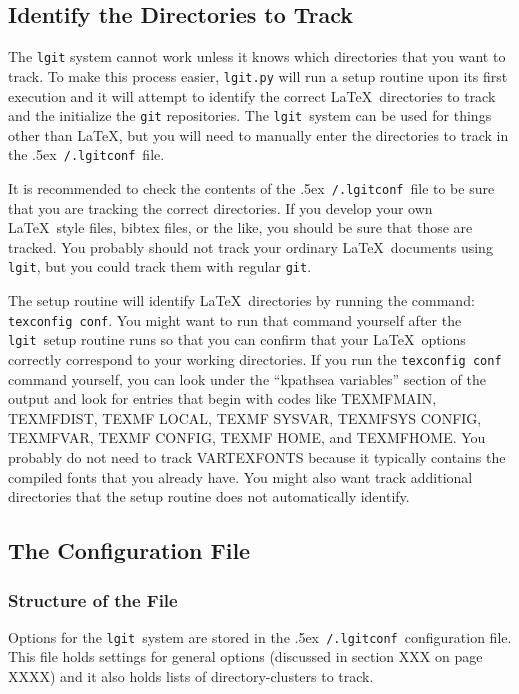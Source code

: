 \documentclass{ltxdoc}
\def\bobtilde{\lower.5ex\hbox{\tt \string~}}%
\def\ucmd#1{{\tt {#1}}}
\def\lgitconf{\bobtilde\ucmd{/.lgitconf}}
\def\lgit{{\tt lgit}}
\begin{document}
\subsection{Identify the Directories to Track}
\label{dirtrack}The \ucmd{lgit} system cannot work unless it knows which directories that you want to track. To make this process easier, \ucmd{lgit.py} will run a setup routine upon its first execution and it will attempt to identify the correct \LaTeX\ directories to track and the initialize the \ucmd{git} repositories.  The \lgit\ system can be used for things other than \LaTeX, but you will need to manually enter the directories to track in the \lgitconf\ file.

It is recommended to check the contents of the \lgitconf\ file to be sure that you are tracking the correct directories.  If you develop your own \LaTeX\ style files, bibtex files, or the like, you should be sure that those are tracked.  You probably should not track your ordinary \LaTeX\ documents using \ucmd{lgit}, but you could track them with regular \ucmd{git}.

The setup routine will identify \LaTeX\ directories by running the command: \ucmd{texconfig conf}.  You might want to run that command yourself after the \lgit\ setup routine runs so that you can confirm that your \LaTeX\ options correctly correspond to your working directories.  If you run the \ucmd{texconfig conf} command yourself, you can look under the ``kpathsea variables'' section of the output and look for entries that begin with codes like TEXMFMAIN, TEXMFDIST, TEXMF\hskip0pt LOCAL, TEXMF\hskip0pt SYSVAR, TEXMFSYS\hskip0pt CONFIG, TEXMFVAR, TEXMF\hskip0pt CONFIG, TEXMF\hskip0pt HOME, and TEXMFHOME. You probably do not need to track VARTEXFONTS because it typically contains the compiled fonts that you already have.  You might also want track additional directories that the setup routine does not automatically identify.

\subsection{The Configuration File}
\subsubsection{Structure of the File}
\label{configfile}Options for the \lgit\ system are stored in the \lgitconf\ configuration file.  This file holds settings for general options (discussed in section XXX on page XXXX) and it also holds lists of directory-clusters to track.
\end{document}
